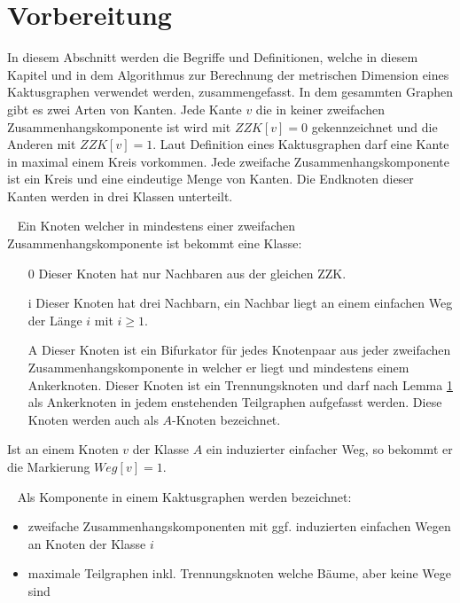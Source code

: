 \section{Vorbereitung}
\vspace{-4mm}
In diesem Abschnitt werden die Begriffe und Definitionen, welche in diesem Kapitel und in dem Algorithmus zur Berechnung der metrischen Dimension eines Kaktusgraphen verwendet werden, zusammengefasst.
\newline
In dem gesammten Graphen gibt es zwei Arten von Kanten. 
Jede Kante $v$ die in keiner zweifachen Zusammenhangskomponente ist wird mit $ZZK[v]=0$ gekennzeichnet und die Anderen mit $ZZK[v]=1$. Laut Definition eines Kaktusgraphen darf eine Kante in maximal einem Kreis vorkommen. Jede zweifache Zusammenhangskomponente ist ein Kreis und eine eindeutige Menge von Kanten. Die Endknoten dieser Kanten werden in drei Klassen unterteilt.
\begin{defi}~\newline
Ein Knoten welcher in mindestens einer zweifachen Zusammenhangskomponente ist bekommt eine Klasse:
\begin{itemize}
\item[0] Dieser Knoten hat nur Nachbaren aus der gleichen ZZK.
\item[i] Dieser Knoten hat drei Nachbarn, ein Nachbar liegt an einem einfachen Weg der Länge $i$ mit $i \geq 1$.
\item[A] Dieser Knoten ist ein Bifurkator für jedes Knotenpaar aus jeder zweifachen Zusammenhangskomponente in welcher er liegt und mindestens einem Ankerknoten. Dieser Knoten ist ein Trennungsknoten und darf nach Lemma \ref{} als Ankerknoten in jedem enstehenden Teilgraphen aufgefasst werden. Diese Knoten werden auch als $A$-Knoten bezeichnet.
\end{itemize}
\end{defi}
Ist an einem Knoten $v$ der Klasse $A$ ein induzierter einfacher Weg, so bekommt er die Markierung $Weg[v]=1$.
\begin{defi}[Komponente]~\newline
Als Komponente in einem Kaktusgraphen werden bezeichnet:
\begin{itemize}
\item zweifache Zusammenhangskomponenten mit ggf. induzierten einfachen Wegen an Knoten der Klasse $i$
\item maximale Teilgraphen inkl. Trennungsknoten welche Bäume, aber keine Wege sind 
\end{itemize}
\end{defi}
